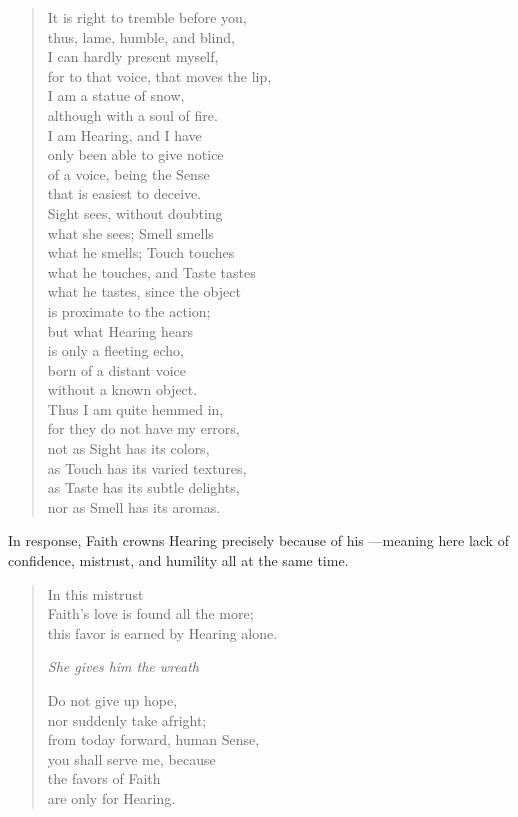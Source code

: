 \begin{verse}
It is right to tremble before you,\\
thus, lame, humble, and blind,\\
I can hardly present myself,\\
for to that voice, that moves the lip,\\
I am a statue of snow,\\
although with a soul of fire.\\
I am Hearing, and I have\\
only been able to give notice\\
of a voice, being the Sense\\
that is easiest to deceive.\\
Sight sees, without doubting\\
what she sees; Smell smells\\
what he smells; Touch touches\\
what he touches, and Taste tastes\\
what he tastes, since the object\\
is proximate to the action;\\
but what Hearing hears\\
is only a fleeting echo,\\
born of a distant voice\\
without a known object.\\
Thus I am quite hemmed in,\\
for they do not have my errors,\\
not as Sight has its colors,\\
as Touch has its varied textures,\\
as Taste has its subtle delights,\\
nor as Smell has its aromas.%
  \autocite[; original text in appendix\XXX]{Calderon:Retiro}
\end{verse}

In response, Faith crowns Hearing precisely because of his ---meaning here lack of confidence, mistrust, and humility all at the same time.
\begin{verse}
In this mistrust\\
Faith's love is found all the more;\\
this favor is earned by Hearing alone.

\emph{She gives him the wreath}

Do not give up hope,\\
nor suddenly take afright;\\
from today forward, human Sense,\\
you shall serve me, because\\
the favors of Faith\\
are only for Hearing.%
  \autocite[]{Calderon:Retiro}
\end{verse}


